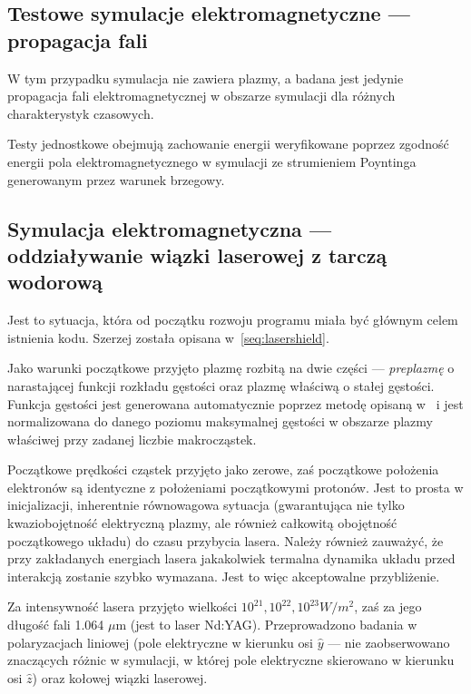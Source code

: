 \subsection{Testowe symulacje elektromagnetyczne --- propagacja fali}
W tym przypadku symulacja nie zawiera plazmy, a badana jest jedynie propagacja fali elektromagnetycznej w obszarze
symulacji dla różnych charakterystyk czasowych. 

Testy jednostkowe obejmują zachowanie energii weryfikowane poprzez zgodność
energii pola elektromagnetycznego w symulacji ze strumieniem Poyntinga generowanym
przez warunek brzegowy. %


\subsection{Symulacja elektromagnetyczna --- oddziaływanie wiązki laserowej z tarczą wodorową}

Jest to sytuacja, która od początku rozwoju programu miała być głównym celem istnienia kodu. Szerzej została opisana w~\ref{seq:lasershield}.

Jako warunki początkowe przyjęto plazmę rozbitą na dwie części ---
\emph{preplazmę} o narastającej funkcji rozkładu gęstości oraz plazmę właściwą
o stałej gęstości. Funkcja gęstości jest generowana automatycznie poprzez
metodę opisaną w~\cite{birdsall} i jest normalizowana do danego poziomu
maksymalnej gęstości w obszarze plazmy właściwej przy zadanej liczbie
makrocząstek.

Początkowe prędkości cząstek przyjęto jako zerowe, zaś początkowe położenia
elektronów są identyczne z położeniami początkowymi protonów. Jest to prosta
w inicjalizacji, inherentnie równowagowa sytuacja (gwarantująca nie tylko
kwaziobojętność elektryczną plazmy, ale również całkowitą obojętność
początkowego układu) do czasu przybycia lasera. Należy również zauważyć, że
przy zakładanych energiach lasera jakakolwiek termalna dynamika układu przed
interakcją zostanie szybko wymazana. Jest to więc akceptowalne przybliżenie.

Za intensywność lasera przyjęto wielkości $10^{21}, 10^{22}, 10^{23} W/m^2$,
zaś za jego długość fali 1.064 $\mu$m (jest to laser Nd:YAG). Przeprowadzono
badania w polaryzacjach liniowej (pole elektryczne w kierunku osi $\hat{y}$ ---
nie zaobserwowano znaczących różnic w symulacji, w której pole elektryczne
skierowano w kierunku osi $\hat{z}$)
oraz kołowej wiązki laserowej.

